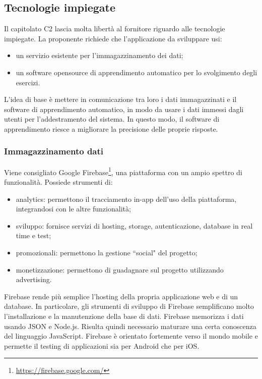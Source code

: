 \documentclass[11pt,a4paper]{article}
\begin{document}
	\subsection{Tecnologie impiegate}
	Il capitolato C2 lascia molta libertà al fornitore riguardo alle tecnologie impiegate. La proponente richiede che l'applicazione da sviluppare usi:
	\begin{itemize}
		\item un servizio esistente per l'immagazzinamento dei dati;
		\item un software opensource di apprendimento automatico per lo svolgimento degli esercizi.
	\end{itemize}
	
	L'idea di base è mettere in comunicazione tra loro i dati immagazzinati e il software di apprendimento automatico, in modo da usare i dati immessi dagli utenti per l'addestramento del sistema. In questo modo, il software di apprendimento riesce a migliorare la precisione delle proprie risposte.
	\subsubsection{Immagazzinamento dati}
		Viene consigliato Google Firebase\footnote{\url{https://firebase.google.com/}}, una piattaforma con un ampio spettro di funzionalità. Possiede strumenti di:
		\begin{itemize}
			\item analytics: permettono il tracciamento in-app dell'uso della piattaforma, integrandosi con le altre funzionalità;
			\item sviluppo: fornisce servizi di hosting, storage, autenticazione, database in real time e test; 
			\item promozionali: permettono la gestione ``social" del progetto;
			\item monetizzazione: permettono di guadagnare sul progetto utilizzando advertising.
		\end{itemize}	 
	
		Firebase rende più semplice l'hosting della propria applicazione web e di un database. In particolare, gli strumenti di sviluppo di Firebase semplificano molto l'installazione e la manutenzione della base di dati. Firebase memorizza i dati usando JSON e Node.js. Risulta quindi necessario maturare una certa conoscenza del linguaggio JavaScript.
	Firebase è orientato fortemente verso il mondo mobile e permette il testing di applicazioni sia per Android che per iOS.
	
\end{document}
